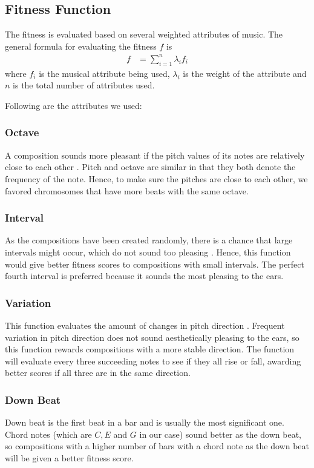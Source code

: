 \documentclass[conference]{IEEEtran}
\begin{document}
\subsection{Fitness Function}
The fitness is evaluated based on several weighted attributes of music. The general formula for evaluating the fitness $f$ is
\begin{align*}
f &= \sum_{i=1}^{n} \lambda_{i}f_{i}
\end{align*}
where $f_{i}$ is the musical attribute being used, $\lambda_{i}$ is the weight of the attribute and $n$ is the total number of attributes used.

Following are the attributes we used:

\subsubsection{Octave}
A composition sounds more pleasant if the pitch values of its notes are relatively close to each other \cite{b2}. Pitch and octave are similar in that they both denote the frequency of the note. Hence, to make sure the pitches are close to each other, we favored chromosomes that have more beats with the same octave.

\subsubsection{Interval}
As the compositions have been created randomly, there is a chance that large intervals might occur, which do not sound too pleasing \cite{b3}. Hence, this function would give better fitness scores to compositions with small intervals. The perfect fourth interval is preferred \cite{b1} because it sounds the most pleasing to the ears.

\subsubsection{Variation}
This function evaluates the amount of changes in pitch direction \cite{b2}. Frequent variation in pitch direction does not sound aesthetically pleasing to the ears, so this function rewards compositions with a more stable direction. The function will evaluate every three succeeding notes to see if they all rise or fall, awarding better scores if all three are in the same direction.

\subsubsection{Down Beat}
Down beat is the first beat in a bar and is usually the most significant one. Chord notes (which are $C, E$ and $G$ in our case) sound better as the down beat, so compositions with a higher number of bars with a chord note as the down beat will be given a better fitness score.
\end{document}

